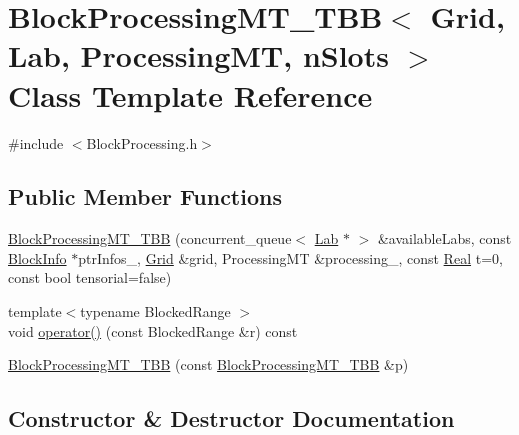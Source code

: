 \hypertarget{class_block_processing_m_t___t_b_b}{}\section{Block\+Processing\+M\+T\+\_\+\+T\+B\+B$<$ Grid, Lab, Processing\+M\+T, n\+Slots $>$ Class Template Reference}
\label{class_block_processing_m_t___t_b_b}


{\ttfamily \#include $<$Block\+Processing.\+h$>$}

\subsection*{Public Member Functions}
\begin{DoxyCompactItemize}
\item 
\hyperlink{class_block_processing_m_t___t_b_b_ab593a07d303a80c94ad90df501d82dad}{Block\+Processing\+M\+T\+\_\+\+T\+B\+B} (concurrent\+\_\+queue$<$ \hyperlink{_definitions_8h_ae720d9054713370bbf4c86860e4dde70}{Lab} $\ast$ $>$ \&available\+Labs, const \hyperlink{struct_block_info}{Block\+Info} $\ast$ptr\+Infos\+\_\+, \hyperlink{class_grid}{Grid} \&grid, Processing\+M\+T \&processing\+\_\+, const \hyperlink{_h_d_f5_dumper_8h_a445a5f0e2a34c9d97d69a3c2d1957907}{Real} t=0, const bool tensorial=false)
\item 
{\footnotesize template$<$typename Blocked\+Range $>$ }\\void \hyperlink{class_block_processing_m_t___t_b_b_aaef2110d9801cdcb5aec76b1d0c1e343}{operator()} (const Blocked\+Range \&r) const 
\item 
\hyperlink{class_block_processing_m_t___t_b_b_acf41642fa9233a7557a098285e5dd60c}{Block\+Processing\+M\+T\+\_\+\+T\+B\+B} (const \hyperlink{class_block_processing_m_t___t_b_b}{Block\+Processing\+M\+T\+\_\+\+T\+B\+B} \&p)
\end{DoxyCompactItemize}


\subsection{Constructor \& Destructor Documentation}
\hypertarget{class_block_processing_m_t___t_b_b_ab593a07d303a80c94ad90df501d82dad}{}

